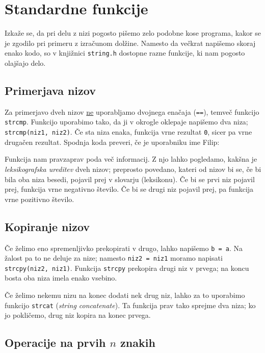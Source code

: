 \section{Standardne funkcije}

Izkaže se, da pri delu z nizi pogosto pišemo zelo podobne kose programa, kakor
se je zgodilo pri primeru z izračunom dolžine.
Namesto da večkrat napišemo skoraj enako kodo, so v knjižnici \verb+string.h+
dostopne razne funkcije, ki nam pogosto olajšajo delo.

\subsection{Primerjava nizov}

Za primerjavo dveh nizov \underline{ne} uporabljamo dvojnega enačaja
(\verb+==+), temveč funkcijo \verb+strcmp+.
Funkcijo uporabimo tako, da ji v okrogle oklepaje napišemo dva niza;
\verb+strcmp(niz1, niz2)+.
Če sta niza enaka, funkcija vrne rezultat \verb+0+, sicer pa vrne drugačen
rezultat.
Spodnja koda preveri, če je uporabniku ime Filip:

Funkcija nam pravzaprav poda več informacij.
Z njo lahko pogledamo, kakšna je \textit{leksikografska ureditev} dveh nizov;
preprosto povedano, kateri od nizov bi se, če bi bila oba niza besedi, pojavil
prej v slovarju (leksikonu).
Če bi se prvi niz pojavil prej, funkcija vrne negativno število.
Če bi se drugi niz pojavil prej, pa funkcija vrne pozitivno število.

\subsection{Kopiranje nizov}

Če želimo eno spremenljivko prekopirati v drugo, lahko napišemo \verb+b = a+.
Na žalost pa to ne deluje za nize; namesto \verb+niz2 = niz1+ moramo napisati
\verb+strcpy(niz2, niz1)+.
Funkcija \verb+strcpy+ prekopira drugi niz v prvega; na koncu bosta oba niza
imela enako vsebino.

Če želimo nekemu nizu na konec dodati nek drug niz, lahko za to uporabimo
funkcijo \verb+strcat+ (\textit{string concatenate}).
Ta funkcija prav tako sprejme dva niza; ko jo pokličemo, drug niz kopira na
konec prvega.

\subsection{Operacije na prvih $n$ znakih}


